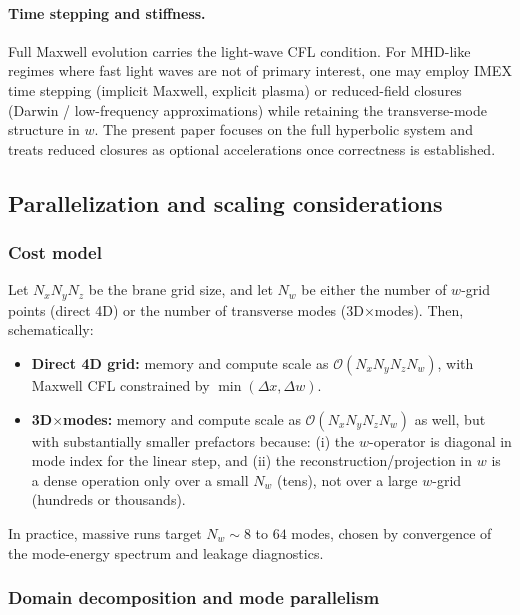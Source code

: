 \documentclass[11pt]{article}
\begin{document}
\paragraph{Time stepping and stiffness.}
Full Maxwell evolution carries the light-wave CFL condition. For MHD-like regimes
where fast light waves are not of primary interest, one may employ IMEX time
stepping (implicit Maxwell, explicit plasma) or reduced-field closures (Darwin /
low-frequency approximations) while retaining the transverse-mode structure in \(w\).
The present paper focuses on the full hyperbolic system and treats reduced closures
as optional accelerations once correctness is established.

\subsection{Parallelization and scaling considerations}
\label{sec:hpc_scaling}

\subsubsection*{Cost model}

Let \(N_xN_yN_z\) be the brane grid size, and let \(N_w\) be either the number of
\(w\)-grid points (direct 4D) or the number of transverse modes (3D\(\times\)modes).
Then, schematically:
\begin{itemize}[leftmargin=1.7em]
\item \textbf{Direct 4D grid:} memory and compute scale as
\(\mathcal{O}(N_xN_yN_zN_w)\), with Maxwell CFL constrained by \(\min(\Delta x,\Delta w)\).
\item \textbf{3D\(\times\)modes:} memory and compute scale as
\(\mathcal{O}(N_xN_yN_zN_w)\) as well, but with substantially smaller prefactors because:
(i) the \(w\)-operator is diagonal in mode index for the linear step, and
(ii) the reconstruction/projection in \(w\) is a dense operation only over a small
\(N_w\) (tens), not over a large \(w\)-grid (hundreds or thousands).
\end{itemize}

In practice, massive runs target \(N_w\sim 8\) to \(64\) modes, chosen by convergence
of the mode-energy spectrum and leakage diagnostics.

\subsubsection*{Domain decomposition and mode parallelism}
\end{document}
